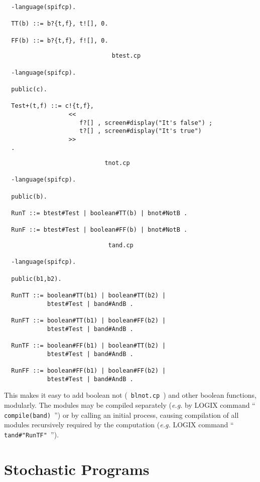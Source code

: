 \begin{verbatim}
  -language(spifcp).

  TT(b) ::= b?{t,f}, t![], 0.

  FF(b) ::= b?{t,f}, f![], 0.
\end{verbatim}

{\samepage
\begin{verbatim}
                              btest.cp

  -language(spifcp).

  public(c).

  Test+(t,f) ::= c!{t,f},
                  <<
                     f?[] , screen#display("It's false") ;
                     t?[] , screen#display("It's true")
                  >>
  .
\end{verbatim}
}

{\samepage
\begin{verbatim}
                            tnot.cp

  -language(spifcp).

  public(b).

  RunT ::= btest#Test | boolean#TT(b) | bnot#NotB .

  RunF ::= btest#Test | boolean#FF(b) | bnot#NotB .
\end{verbatim}
}

\begin{verbatim}
                             tand.cp

  -language(spifcp).

  public(b1,b2).

  RunTT ::= boolean#TT(b1) | boolean#TT(b2) |
            btest#Test | band#AndB .

  RunFT ::= boolean#TT(b1) | boolean#FF(b2) |
            btest#Test | band#AndB .

  RunTF ::= boolean#FF(b1) | boolean#TT(b2) |
            btest#Test | band#AndB .

  RunFF ::= boolean#FF(b1) | boolean#FF(b2) |
            btest#Test | band#AndB .
\end{verbatim}

\noindent
This makes it easy to add boolean not (\verb+ blnot.cp +) and other
boolean functions, modularly.  The modules may be compiled separately
({\em e.g.} by LOGIX command ``\verb+ compile(band) +'') or by calling
an initial process, causing compilation of all modules recursively
required by the computation 
({\em e.g.} LOGIX command ``\verb+ tand#"RunTF" +'').

\chapter{Stochastic Programs}
\label{stochastic}

